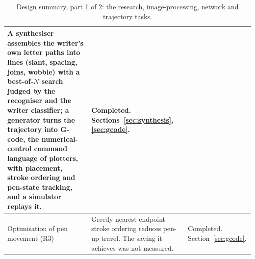 \begin{table}[!htbp]
\begin{tabular}{|p{3.1cm}|p{7.4cm}|p{3.7cm}|}
A synthesiser assembles the writer's own letter paths into lines (slant, spacing, joins, wobble) with a best-of-$N$ search judged by the recogniser and the writer classifier; a generator turns the trajectory into G-code, the numerical-control command language of plotters, with placement, stroke ordering and pen-state tracking, and a simulator replays it. &
Completed. Sections~\ref{sec:synthesis}, \ref{sec:gcode}. \\
\hline
Optimisation of pen movement (R3) &
Greedy nearest-endpoint stroke ordering reduces pen-up travel. The saving it achieves was not measured. &
Completed. Section~\ref{sec:gcode}. \\
\hline
\end{tabular}
\caption{Design summary, part 1 of 2: the research, image-processing, network and trajectory tasks.}
\label{tab:des-summary}
\end{table}

